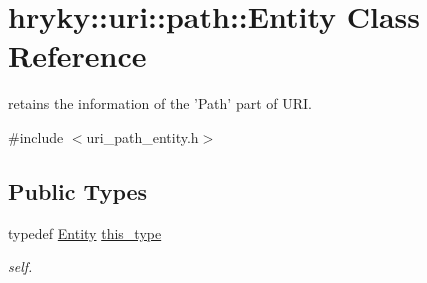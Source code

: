 \hypertarget{classhryky_1_1uri_1_1path_1_1_entity}{\section{hryky\-:\-:uri\-:\-:path\-:\-:Entity Class Reference}
\label{classhryky_1_1uri_1_1path_1_1_entity}
}


retains the information of the 'Path' part of U\-R\-I.  




{\ttfamily \#include $<$uri\-\_\-path\-\_\-entity.\-h$>$}

\subsection*{Public Types}
\begin{DoxyCompactItemize}
\item 
\hypertarget{classhryky_1_1uri_1_1path_1_1_entity_ab451cbde937d2551ecd5c3360cb58100}{typedef \hyperlink{classhryky_1_1uri_1_1path_1_1_entity}{Entity} \hyperlink{classhryky_1_1uri_1_1path_1_1_entity_ab451cbde937d2551ecd5c3360cb58100}{this\-\_\-type}}\label{classhryky_1_1uri_1_1path_1_1_entity_ab451cbde937d2551ecd5c3360cb58100}

\begin{DoxyCompactList}\small\item\em self. \end{DoxyCompactList}\end{DoxyCompactItemize}
